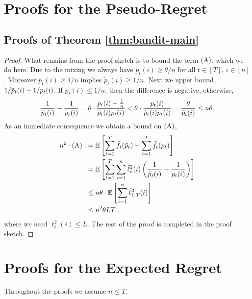 \section{Proofs for the Pseudo-Regret}
\subsection{Proofs of Theorem \ref{thm:bandit-main}}
\begin{proof}
What remains from the proof sketch is to bound the term $\rA$, which we do here.
Due to the mixing we always have $\tilde{p}_t(i) \geq \theta / n$ for all $t\in [T]$, $i \in [n]$. Moreover $p_t(i) \geq 1 / n$ implies $\tilde{p}_t(i) \geq 1 / n$. Next we upper bound
$
{1}/{\tilde{p}_t(i)} - {1}/{p_t(i)}
$. 
If $p_t(i) \leq 1/n$, then the difference is negative, otherwise, 
\begin{align*}
\frac{1}{\tilde{p}_t(i)} - \frac{1}{p_t(i)} =\theta \cdot \frac{p_t(i) -\frac{1}{n}}{\tilde{p}_t(i) p_t(i)}
< \theta \cdot \frac{p_t(i)}{\tilde{p}_t(i) p_t(i)}=\frac{\theta}{\tilde{p}_t(i)} \leq n \theta.
\end{align*}
As an immediate consequence we obtain a bound on $\rA$,
\begin{align*}
n^2\cdot \rA:
&=
\expval {\sumtt \tf_t(\tp_t) - \sumtt \tf_t(p_t)  }  \\
&= \expval {\sumtt \sumin  \tell^2_{t}(i) \left( \frac{1}{\tp_t(i)} - \frac{1}{p_t(i)} \right) }  \\
&\leq n  \theta \cdot  \expval { \sumin \tell_{1:T}^2(i) }\\
& \leq n^2  \theta L T~,
\end{align*}
where we used $\ell_t^2(i) \leq L$.
The rest of the proof is completed in the proof sketch.
\end{proof}





\section{Proofs for the Expected Regret} \label{sec:ProofsExpectedRegret}
Throughout the proofs we assume $n \leq T$.
